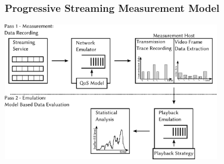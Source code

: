 \documentclass{beamer}
\begin{document}
\begin{frame}
	\frametitle{Progressive Streaming Measurement Model}

	\begin{center}
		\includegraphics[height=6cm]{../../chapters/03-streaming/images/measurement-model.pdf}
	\end{center}




\end{frame}





\end{document}
